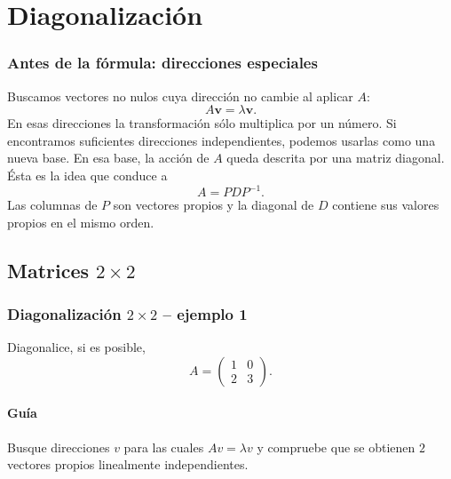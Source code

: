 \section{Diagonalización}

\subsubsection*{Antes de la fórmula: direcciones especiales}

Buscamos vectores no nulos cuya dirección no cambie al aplicar $A$:
\[
A\mathbf v=\lambda\mathbf v.
\]
En esas direcciones la transformación sólo multiplica por un número. Si encontramos suficientes direcciones independientes, podemos usarlas como una nueva base.
\medskip
En esa base, la acción de $A$ queda descrita por una matriz diagonal. Ésta es la idea que conduce a
\[
\boxed{A=PDP^{-1}}.
\]
Las columnas de $P$ son vectores propios y la diagonal de $D$ contiene sus valores propios en el mismo orden.

\subsection{Matrices $2\times 2$}

\subsubsection*{Diagonalización $2\times 2$ -- ejemplo 1}

Diagonalice, si es posible,
\[
A=\begin{pmatrix}1 & 0\\2 & 3\end{pmatrix}.
\]

\paragraph{Guía}
Busque direcciones $v$ para las cuales $Av=\lambda v$ y compruebe que se obtienen $2$ vectores propios linealmente independientes.



